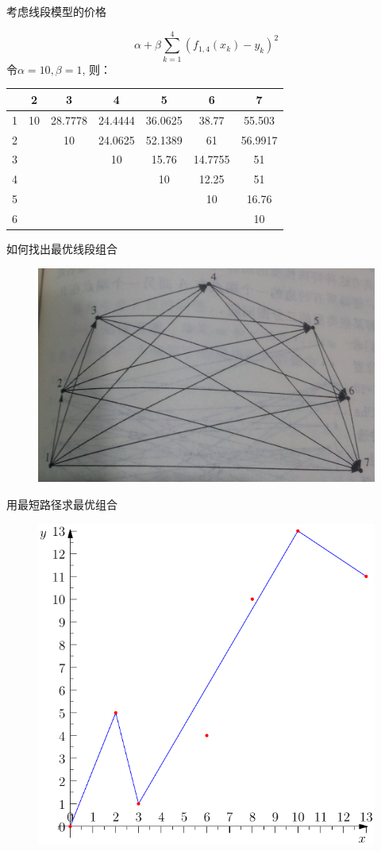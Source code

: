 \documentclass[UTF8]{ctexbeamer}
\begin{document}
\begin{frame}{考虑线段模型的价格}
  \begin{block}{}
    \[
    \alpha + \beta\sum_{k=1}^4(f_{1,4}(x_k)-y_k)^2
    \]
    令$\alpha=10, \beta=1$, 则：
  \end{block}
  \begin{table}
    \centering
    \begin{tabular}{ccccccc}
      \hline
      & 2 & 3 & 4 & 5 & 6 & 7\\
      \hline
      1 & 10 & 28.7778 & 24.4444 & 36.0625 & 38.77  & 55.503 \\
      2 &  & 10 & 24.0625 & 52.1389 & 61 & 56.9917\\
      3 &  &  & 10 & 15.76 & 14.7755 & 51\\
      4 &  &  &  & 10 & 12.25 & 51\\
      5 &  &  &  & & 10 & 16.76\\
      6 &  &  &  & & & 10\\
      \hline
    \end{tabular}
  \end{table}
\end{frame}

\begin{frame}{如何找出最优线段组合}
  \begin{figure}
    \centering
    \includegraphics[width=.5\textwidth]{optimal.png}
  \end{figure}

\end{frame}

\begin{frame}{用最短路径求最优组合}
  \begin{figure}
    \centering
    \includegraphics[width=.5\textwidth]{optline.pdf}
  \end{figure}
\end{frame}
\end{document}
